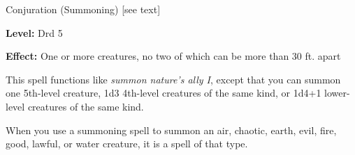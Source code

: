 
Conjuration (Summoning) [see text]

\textbf{Level:} Drd 5

\textbf{Effect:} One or more creatures, no two of which can be more than 30 ft. 
apart

This spell functions like \textit{summon nature's ally I}, except that you can 
summon one 5th-level creature, 1d3 4th-level creatures of the same kind, or 1d4+1 
lower-level creatures of the same kind.

When you use a summoning spell to summon an air, chaotic, earth, evil, fire, good, 
lawful, or water creature, it is a spell of that type.

